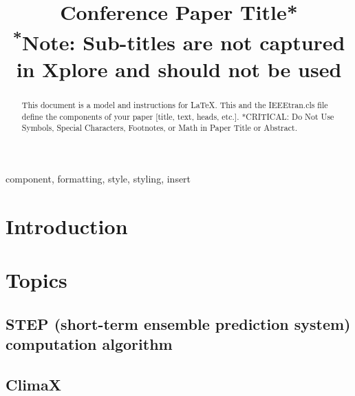 \documentclass[conference]{IEEEtran}
\begin{document}
\title{Conference Paper Title*\\
{\footnotesize \textsuperscript{*}Note: Sub-titles are not captured in Xplore and
should not be used}
}

\author{
\and
{}
}

\maketitle

\begin{abstract}
This document is a model and instructions for \LaTeX.
This and the IEEEtran.cls file define the components of your paper [title, text, heads, etc.]. *CRITICAL: Do Not Use Symbols, Special Characters, Footnotes, 
or Math in Paper Title or Abstract.
\end{abstract}

\begin{IEEEkeywords}
component, formatting, style, styling, insert
\end{IEEEkeywords}

\section{Introduction}


\section{Topics}
\subsection{STEP (short-term ensemble prediction system) computation algorithm}


\subsection{ClimaX}

\end{document}
